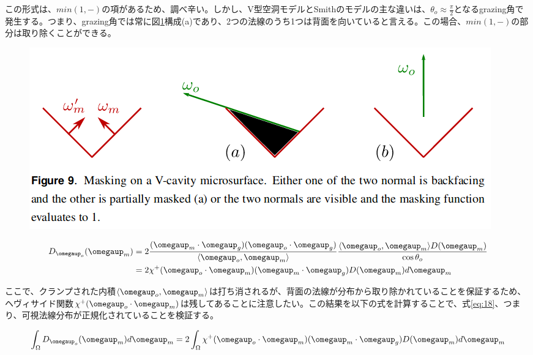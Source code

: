 \documentclass[a4j,xelatex,ja=standard]{bxjsarticle}
\begin{document}
この形式は、$min(1, -)$の項があるため、調べ辛い。しかし、V型空洞モデルとSmithのモデルの主な違いは、$\theta_o \approx \frac{\pi}{2}$となるgrazing角で発生する。つまり、grazing角では常に図\ref{fig:9}構成(a)であり、2つの法線のうち1つは背面を向いていると言える。この場合、$min(1, -)$の部分は取り除くことができる。

\begin{figure}
    \includegraphics[width=\textwidth]{Figure9.png}
    \caption{}
    \label{fig:9}
\end{figure}

\begin{equation}
    \begin{split}
        D_{\boldsymbol{\omegaup}_o}(\boldsymbol{\omegaup}_m)
        &= 2 \frac{(\boldsymbol{\omegaup}_m \cdot \boldsymbol{\omegaup}_g) (\boldsymbol{\omegaup}_o \cdot \boldsymbol{\omegaup}_g)}{\langle \boldsymbol{\omegaup}_o, \boldsymbol{\omegaup}_m \rangle} \frac{\langle \boldsymbol{\omegaup}_o, \boldsymbol{\omegaup}_m \rangle D(\boldsymbol{\omegaup}_m)}{\cos\theta_o} \\
        &= 2 \chi^+(\boldsymbol{\omegaup}_o \cdot \boldsymbol{\omegaup}_m) (\boldsymbol{\omegaup}_m \cdot \boldsymbol{\omegaup}_g) D(\boldsymbol{\omegaup}_m) d\boldsymbol{\omegaup}_m
    \end{split}
    \label{eq:51}
\end{equation}

ここで、クランプされた内積$\langle \boldsymbol{\omegaup}_o, \boldsymbol{\omegaup}_m \rangle$は打ち消されるが、背面の法線が分布から取り除かれていることを保証するため、ヘヴィサイド関数$\chi^+(\boldsymbol{\omegaup}_o \cdot \boldsymbol{\omegaup}_m)$は残してあることに注意したい。この結果を以下の式を計算することで、式\eqref{eq:18}、つまり、可視法線分布が正規化されていることを検証する。

\begin{equation}
    \int_{\Omega} D_{\boldsymbol{\omegaup}_o}(\boldsymbol{\omegaup}_m) d\boldsymbol{\omegaup}_m = 2 \int_{\Omega} \chi^+(\boldsymbol{\omegaup}_o \cdot \boldsymbol{\omegaup}_m) (\boldsymbol{\omegaup}_m \cdot \boldsymbol{\omegaup}_g) D(\boldsymbol{\omegaup}_m) d\boldsymbol{\omegaup}_m
    \label{eq:52}
\end{equation}
\end{document}

